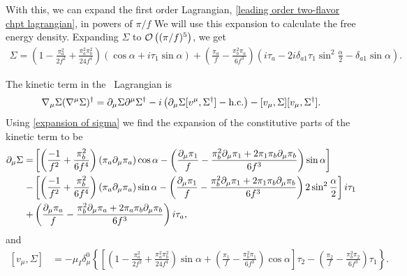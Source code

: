 %
With this, we can expand the first order Lagrangian, \autoref{leading order two-flavor chpt lagrangian}, in powers of $\pi/f$
We will use this expansion to calculate the free energy density.
Expanding $\Sigma$ to $\mathcal O \left((\pi/f)^5\right)$, we get
\begin{align}
    \Sigma =
     \left(
        1 
        - \frac{\pi_a^2}{2f^2}
        + \frac{\pi_a^2\pi_b^2}{24f^4}
    \right)
    (\cos{\alpha} + i \tau_1 \sin{\alpha})
    +
    \left(
        \frac{\pi_a}{f} 
        - \frac{\pi_b^2\pi_a}{6f^3} 
    \right)
    \left(
        i\tau_a - 2i \delta_{a1}\tau_1\sin^2{\frac{\alpha}{2}} - \delta_{a1} \sin{\alpha}
    \right).
    \label{expansion of sigma}
\end{align}
%

The kinetic term in the \chpt\, Lagrangian is
\begin{equation}
    \nabla_\mu \Sigma (\nabla^\mu \Sigma)^\dagger 
    = \partial_\mu \Sigma \partial^\mu \Sigma^\dagger 
    - i \left(\partial_\mu \Sigma [v^\mu, \Sigma^\dagger] - \text{h.c.} \right)
    - [v_\mu,\Sigma][v_\mu, \Sigma^\dagger].
    \label{kinetic term}
\end{equation}
%
Using \autoref{expansion of sigma} we find the expansion of the constitutive parts of the kinetic term to be
\begin{align}
    \notag
    \partial_\mu \Sigma 
    = &
    \left[
        \left(
            \frac{-1}{f^2}
            + \frac{\pi_b^2}{6f^4}
        \right)
        (\pi_a \partial_\mu \pi_a)
        \cos{\alpha}
        - 
        \left(
            \frac{\partial_\mu \pi_1}{f} 
            - \frac{\pi_b^2 \partial_\mu\pi_1
            + 2 \pi_1 \pi_b \partial_\mu\pi_b}{6f^3} 
        \right)
        \sin{\alpha}
    \right]
    \\ \notag 
    - &
    \left[
        \left(
            \frac{-1}{f^2}
            + \frac{\pi_b^2}{6f^4}
        \right)
        (\pi_a \partial_\mu \pi_a)
        \sin{\alpha}
        - \left(
        \frac{\partial_\mu \pi_1}{f} 
        - \frac{\pi_b^2 \partial_\mu\pi_1
        + 2 \pi_1 \pi_b \partial_\mu\pi_b}{6f^3}
        \right)
        2 \sin^2{\frac{\alpha}{2}}
    \right]
    i \tau_1 \\ \label{Sigma derivative}
    +& 
    \left(
        \frac{\partial_\mu \pi_a}{f} 
        - \frac{\pi_b^2 \partial_\mu\pi_a 
        + 2 \pi_a \pi_b \partial_\mu\pi_b}{6f^3} 
    \right)
    i \tau_a,
\end{align}
%
and
\begin{align}
    [v_\mu,\Sigma]
    & =
    -\mu_I \delta^0_\mu
    \left\{
        \left[
        \left(
            1 
            - \frac{\pi_a^2}{2f^2}
            + \frac{\pi_a^2\pi_b^2}{24f^4}
        \right)
        \sin{\alpha}
        + 
        \left(
            \frac{\pi_1}{f} 
            - \frac{\pi_b^2\pi_1}{6f^3} 
        \right) \cos{\alpha}
        \right]
         \tau_2
        -
        \left(
            \frac{\pi_2}{f} 
            - \frac{\pi_b^2\pi_2}{6f^3} 
        \right)
        \tau_1
    \right\}.
    \label{sigma commutator}
\end{align}
